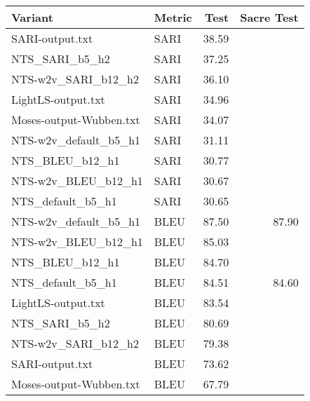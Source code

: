 \begin{tabular}{llrr}
\toprule
                 Variant & Metric &  Test & Sacre Test \\
\midrule
         SARI-output.txt &   SARI & 38.59 &            \\
          NTS\_SARI\_b5\_h2 &   SARI & 37.25 &            \\
     NTS-w2v\_SARI\_b12\_h2 &   SARI & 36.10 &            \\
      LightLS-output.txt &   SARI & 34.96 &            \\
 Moses-output-Wubben.txt &   SARI & 34.07 &            \\
   NTS-w2v\_default\_b5\_h1 &   SARI & 31.11 &            \\
         NTS\_BLEU\_b12\_h1 &   SARI & 30.77 &            \\
     NTS-w2v\_BLEU\_b12\_h1 &   SARI & 30.67 &            \\
       NTS\_default\_b5\_h1 &   SARI & 30.65 &            \\
   NTS-w2v\_default\_b5\_h1 &   BLEU & 87.50 &      87.90 \\
     NTS-w2v\_BLEU\_b12\_h1 &   BLEU & 85.03 &            \\
         NTS\_BLEU\_b12\_h1 &   BLEU & 84.70 &            \\
       NTS\_default\_b5\_h1 &   BLEU & 84.51 &      84.60 \\
      LightLS-output.txt &   BLEU & 83.54 &            \\
          NTS\_SARI\_b5\_h2 &   BLEU & 80.69 &            \\
     NTS-w2v\_SARI\_b12\_h2 &   BLEU & 79.38 &            \\
         SARI-output.txt &   BLEU & 73.62 &            \\
 Moses-output-Wubben.txt &   BLEU & 67.79 &            \\
\bottomrule
\end{tabular}
